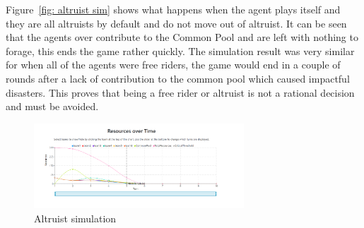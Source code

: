 Figure~\ref{fig: altruist sim}  shows what happens when the agent plays itself and they are all altruists by default and do not move out of altruist. It can be seen that the agents over contribute to the Common Pool and are left with nothing to forage, this ends the game rather quickly. The simulation result was very similar for when all of the agents were free riders, the game would end in a couple of rounds after a lack of contribution to the common pool which caused impactful disasters.  This proves that being a free rider or altruist is not a rational decision and must be avoided. 

\begin{figure}[!htb]
    \centering
    \includegraphics[width=0.7\textwidth]{images/altruist sim.png}
    \caption{Altruist simulation}
    \label{fig:  altruist sim}
\end{figure}